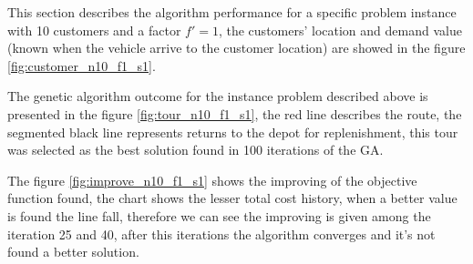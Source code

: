 This section describes the algorithm performance for a specific problem instance with 10 customers and a factor $f'=1$, the customers' location and demand value (known when the vehicle arrive to the customer location) are showed in the figure \ref{fig:customer_n10_f1_s1}.



The genetic algorithm outcome for the instance problem described above is presented in the figure \ref{fig:tour_n10_f1_s1}, the red line describes the route, the segmented black line represents returns to the depot for replenishment, this tour was selected as the best solution found in 100 iterations of the GA.


The figure \ref{fig:improve_n10_f1_s1} shows the improving of the objective function found, the chart shows the lesser total cost history, when a better value is found the line fall, therefore we can see the improving is given among the iteration 25 and 40, after this iterations the algorithm converges and it's not found a better solution.





